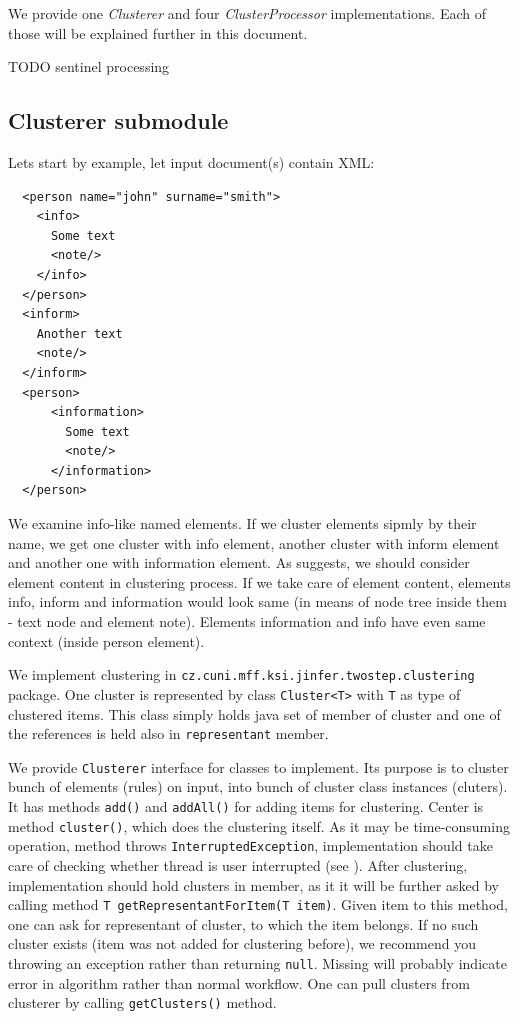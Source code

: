 \documentclass[a4paper,10pt,oneside]{article}
\newcommand{\code}[1]{\texttt{#1}}
\newcommand{\jmodule}[1]{\emph{#1}}
\begin{document}
We provide one \jmodule{Clusterer} and four \jmodule{ClusterProcessor} implementations.
Each of those will be explained further in this document.

TODO sentinel processing

\subsection{Clusterer submodule}
Lets start by example, let input document(s) contain XML:
\begin{verbatim}
  <person name="john" surname="smith">
    <info>
      Some text
      <note/>
    </info>
  </person>
  <inform>
    Another text
    <note/>
  </inform>
  <person>
      <information>
        Some text
        <note/>
      </information>
  </person>
\end{verbatim}
We examine info-like named elements.
If we cluster elements sipmly by their name, we get one cluster with info element, another cluster with inform element and another one with information element.
As \cite{1802522} suggests, we should consider element content in clustering process.
If we take care of element content, elements info, inform and information would look same (in means of node tree inside them - text node and element note).
Elements information and info have even same context (inside person element).

We implement clustering in \code{cz.cuni.mff.ksi.jinfer.twostep.clustering} package.
One cluster is represented by class \code{Cluster<T>} with \code{T} as type of clustered items.
This class simply holds java set of member of cluster and one of the references is held also in \code{representant} member.

We provide \code{Clusterer} interface for classes to implement.
Its purpose is to cluster bunch of elements (rules) on input, into  bunch of cluster class instances  (cluters).
It has methods \code{add()} and \code{addAll()} for adding items for clustering.
Center is method \code{cluster()}, which does the clustering itself.
As it may be time-consuming operation, method throws \code{InterruptedException}, implementation should take care 
of checking whether thread is user interrupted (see \cite{arch}).
After clustering, implementation should hold clusters in member, as it it will be further asked by calling method \code{T getRepresentantForItem(T item)}.
Given item to this method, one can ask for representant of cluster, to which the item belongs.
If no such cluster exists (item was not added for clustering before), we recommend you throwing an exception rather than returning \code{null}.
Missing will probably  indicate error in algorithm rather than normal workflow.
One can pull clusters from clusterer by calling \code{getClusters()} method.
\end{document}

